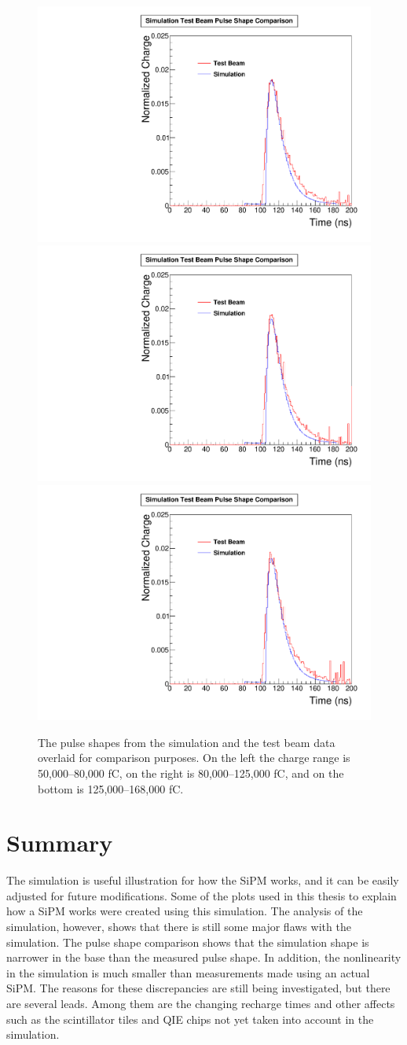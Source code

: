 \begin{figure}
\centering
\includegraphics[width=0.495\linewidth]{Figures/50Comparison.pdf}
\includegraphics[width=0.495\linewidth]{Figures/80Comparison.pdf}
\includegraphics[width=0.495\linewidth]{Figures/125Comparison.pdf}
\caption{The pulse shapes from the simulation and the test beam data overlaid for comparison purposes. On the left the charge range is 50,000--80,000 fC, on the right is 80,000--125,000 fC, and on the bottom is 125,000--168,000 fC.}
\label{fig:2comparison_together}
\end{figure}

\section{Summary}

The simulation is useful illustration for how the SiPM works, and it can be easily adjusted for future modifications. Some of the plots used in this thesis to explain how a SiPM works were created using this simulation. The analysis of the simulation, however, shows that there is still some major flaws with the simulation. The pulse shape comparison shows that the simulation shape is narrower in the base than the measured pulse shape. In addition, the nonlinearity in the simulation is much smaller than measurements made using an actual SiPM. The reasons for these discrepancies are still being investigated, but there are several leads. Among them are the changing recharge times and other affects such as the scintillator tiles and QIE chips not yet taken into account in the simulation. 